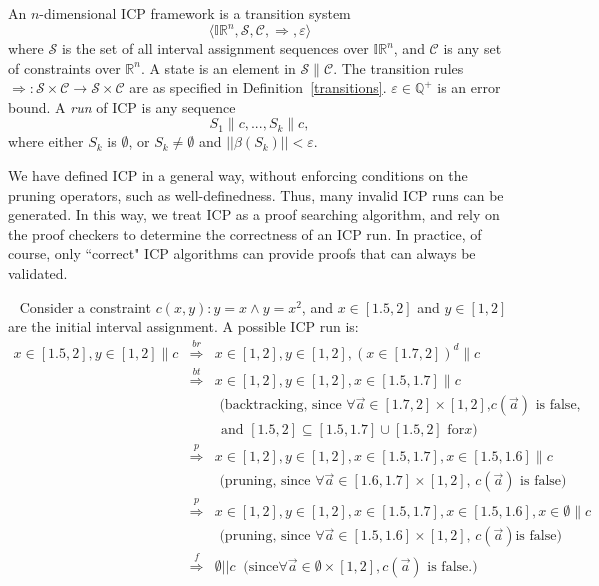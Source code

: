 \documentclass{llncs}
\begin{document}
\begin{definition}
An $n$-dimensional ICP framework is a transition system
$$\langle \mathbb{IR}^n, \mathcal{S}, \mathcal{C}, \Longrightarrow,
\varepsilon\rangle$$
where $\mathcal{S}$ is the set of all interval assignment sequences over
$\mathbb{IR}^n$, and $\mathcal{C}$ is any set of constraints over
$\mathbb{R}^n$. A state is an element in $\mathcal{S}\parallel \mathcal{C}$. The
transition rules $\Longrightarrow: \mathcal{S}\times \mathcal{C}\rightarrow
\mathcal{S} \times \mathcal{C}$ are as specified in
Definition~\ref{transitions}. $\varepsilon\in \mathbb{Q}^+$ is an
error bound. A {\em run} of ICP is any sequence
$$S_1\parallel c, ... , S_k\parallel c,$$
where either $S_k$ is $\emptyset$, or $S_k\neq \emptyset$ and
$||\beta(S_k)||<\varepsilon$.
\end{definition}
\begin{remark}
We have defined ICP in a general way, without enforcing conditions
on the pruning operators, such as well-definedness. Thus, many
invalid ICP runs can be generated. In this way, we treat ICP as a proof
searching algorithm, and rely on the proof checkers to determine the correctness
of an ICP run. In practice, of course, only ``correct" ICP algorithms can
provide proofs that can always be validated.
\end{remark}
\begin{example}~\label{icp-example}
Consider a constraint $c(x,y) : y=x \wedge y = x^2$, and $x\in [1.5,2]$ and
$y\in [1,2]$ are the initial interval assignment. A possible ICP run is:
\begin{eqnarray*}
x\in [1.5,2], y\in [1,2]\parallel c &\stackrel{br}{\Longrightarrow}& x\in [1,2],
y\in [1,2], (x\in [1.7, 2])^d\parallel c\\
&\stackrel{bt}{\Longrightarrow}& x\in [1,2], y\in [1,2], x\in [1.5, 1.7]\parallel c\\
& & \mbox{  (backtracking, since $\forall\vec a\in [1.7,2]\times [1,2]$,
$c(\vec a)$ is false,}\\
& & \ \ \mbox{and $[1.5,2]\subseteq[1.5,1.7]\cup [1.5, 2]$ for
$x$)}\\
&\stackrel{p}{\Longrightarrow}& x\in [1,2], y\in [1,2], x\in [1.5, 1.7], x\in
[1.5, 1.6]\parallel c\\
& & \mbox{  (pruning, since $\forall \vec a\in[1.6,1.7]\times [1, 2]$, $c(\vec
a)$ is false)}\\
&\stackrel{p}{\Longrightarrow}& x\in [1,2], y\in [1,2], x\in [1.5, 1.7],
x\in [1.5, 1.6], x\in \emptyset\parallel c\\
& & \mbox{  (pruning, since $\forall \vec a\in[1.5,1.6]\times [1, 2]$, $c(\vec
a)$
is false)}\\
&\stackrel{f}{\Longrightarrow}& \emptyset||c\ \mbox{ (since
$\forall \vec a\in \emptyset \times [1, 2], c(\vec a)$ is false.)}
\end{eqnarray*}
\end{example}
\end{document}
